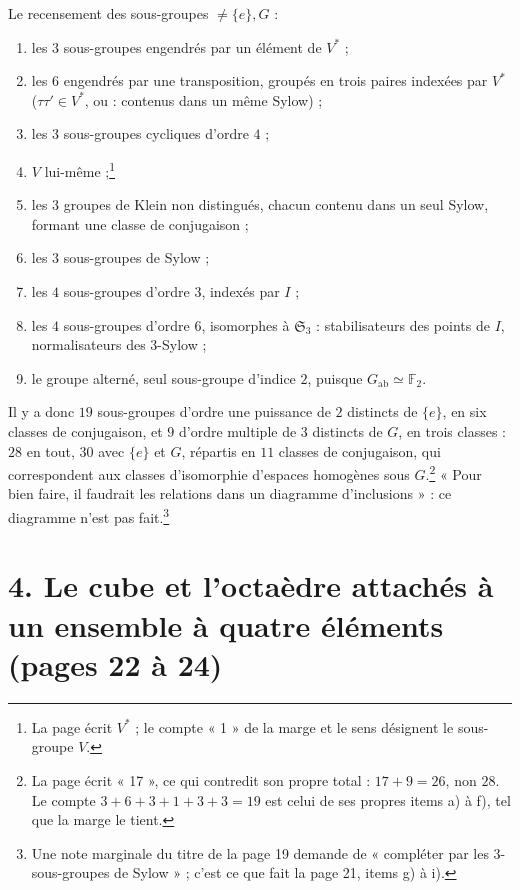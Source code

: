 \documentclass[11pt,a4paper]{article}
\begin{document}
Le recensement des sous-groupes $\neq \{e\}, G$ :
\begin{enumerate}
\item[a)] les $3$ sous-groupes engendrés par un élément de $V^{*}$ ;
\item[b)] les $6$ engendrés par une transposition, groupés en trois paires
indexées par $V^{*}$ ($\tau\tau' \in V^{*}$, ou : contenus dans un même Sylow) ;
\item[c)] les $3$ sous-groupes cycliques d'ordre $4$ ;
\item[d)] $V$ lui-même ;\footnote{La page écrit $V^{*}$ ; le compte « 1 » de la
marge et le sens désignent le sous-groupe $V$.}
\item[e)] les $3$ groupes de Klein non distingués, chacun contenu dans un seul
Sylow, formant une classe de conjugaison ;
\item[f)] les $3$ sous-groupes de Sylow ;
\item[g)] les $4$ sous-groupes d'ordre $3$, indexés par $I$ ;
\item[h)] les $4$ sous-groupes d'ordre $6$, isomorphes à $\mathfrak{S}_3$ :
stabilisateurs des points de $I$, normalisateurs des $3$-Sylow ;
\item[i)] le groupe alterné, seul sous-groupe d'indice $2$, puisque
$G_{\mathrm{ab}} \simeq \mathbb{F}_2$.
\end{enumerate}
Il y a donc $19$ sous-groupes d'ordre une puissance de $2$ distincts de
$\{e\}$, en six classes de conjugaison, et $9$ d'ordre multiple de $3$
distincts de $G$, en trois classes : $28$ en tout, $30$ avec $\{e\}$ et $G$,
répartis en $11$ classes de conjugaison, qui correspondent aux classes
d'isomorphie d'espaces homogènes sous $G$.\footnote{La page écrit « 17 », ce qui
contredit son propre total : $17 + 9 = 26$, non $28$. Le compte
$3 + 6 + 3 + 1 + 3 + 3 = 19$ est celui de ses propres items a) à f), tel que
la marge le tient.} « Pour bien faire, il faudrait les relations dans un
diagramme d'inclusions » : ce diagramme n'est pas fait.\footnote{Une note
marginale du titre de la page 19 demande de « compléter par les
$3$-sous-groupes de Sylow » ; c'est ce que fait la page 21, items g) à i).}

\section*{4. Le cube et l'octaèdre attachés à un ensemble à quatre éléments (pages 22 à 24)}
\end{document}

